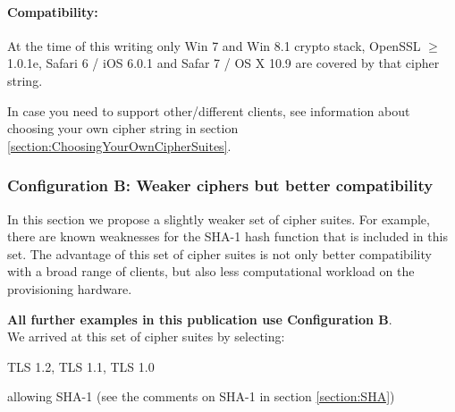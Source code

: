 
\paragraph*{Compatibility:}

At the time of this writing only Win 7 and Win 8.1 crypto stack,
OpenSSL $\ge$ 1.0.1e, Safari 6 / iOS 6.0.1 and Safar 7 / OS X 10.9
are covered by that cipher string.

In case you need to support other/different clients, see information
about choosing your own cipher string in section
\ref{section:ChoosingYourOwnCipherSuites}.

\subsubsection{Configuration B: Weaker ciphers but better compatibility}

In this section we propose a slightly weaker set of cipher suites.  For
example, there are known weaknesses for the SHA-1 hash function that is
included in this set.  The advantage of this set of cipher suites is not only
better compatibility with a broad range of clients, but also less computational
workload on the provisioning hardware.


\textbf{All further examples in this publication use Configuration B}.\\

We arrived at this set of cipher suites by selecting:

\begin{itemize*}
  \item TLS 1.2, TLS 1.1, TLS 1.0
  \item allowing SHA-1 (see the comments on SHA-1 in section \ref{section:SHA})
\end{itemize*}

